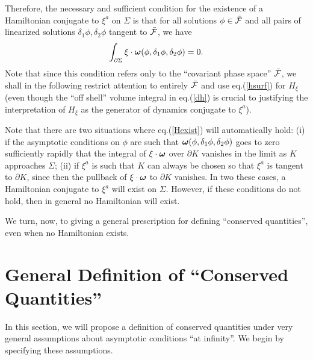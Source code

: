 Therefore, the necessary and sufficient condition for the
existence of a Hamiltonian conjugate to $\xi^a$ on $\Sigma$ is that
for all solutions $\phi \in \bar{\cal F}$ and all pairs of linearized
solutions $\delta_1 \phi, \delta_2 \phi$ tangent to $\bar{\cal F}$, we
have
\begin{equation}
\int_{\partial \Sigma} \xi \cdot {\mbox{\boldmath
$\omega$}}(\phi, \delta_1 \phi, \delta_2 \phi) = 0 .
\label{Hexist}
\end{equation}
Note that since this condition refers only to the ``covariant phase
space'' $\bar{\cal F}$, we shall in the following restrict attention
to entirely $\bar{\cal F}$ and use eq.(\ref{hsurf}) for $H_\xi$ (even
though the ``off shell'' volume integral in eq.(\ref{dh}) is crucial
to justifying the interpretation of $H_\xi$ as the generator of
dynamics conjugate to $\xi^a$).

Note that there are two situations where eq.(\ref{Hexist}) will
automatically hold: (i) if the asymptotic conditions on $\phi$ are
such that ${\mbox{\boldmath $\omega$}}(\phi, \delta_1 \phi, \delta_2
\phi)$ goes to zero sufficiently rapidly that the integral of $\xi
\cdot {\mbox{\boldmath $\omega$}}$ over $\partial K$ vanishes in the
limit as $K$ approaches $\Sigma$; (ii) if $\xi^a$ is such that $K$ can
always be chosen so that $\xi^a$ is tangent to $\partial K$, since
then the pullback of $\xi \cdot {\mbox{\boldmath $\omega$}}$ to
$\partial K$ vanishes. In two these cases, a Hamiltonian conjugate to
$\xi^a$ will exist on $\Sigma$. However, if these conditions do not
hold, then in general no Hamiltonian will exist.

We turn, now, to giving a general prescription for defining ``conserved
quantities'', even when no Hamiltonian exists.


\section{General Definition of ``Conserved Quantities''}

In this section, we will propose a definition of conserved quantities
under very general assumptions about asymptotic conditions ``at
infinity''. We begin by specifying these assumptions.

